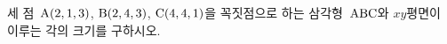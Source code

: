 세 점~$\mathrm{A}(2{,}\mkern3mu\mathopen{}1{,}\mkern3mu\mathopen{}3)$, $\mathrm{B}(2{,}\mkern3mu\mathopen{}4{,}\mkern3mu\mathopen{}3)$, $\mathrm{C}(4{,}\mkern3mu\mathopen{}4{,}\mkern3mu\mathopen{}1)$을 꼭짓점으로 하는 삼각형~$\mathrm{ABC}$와 $xy$평면이 이루는 각의 크기를 구하시오.
